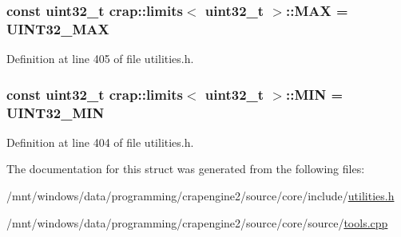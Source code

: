 \subsubsection[{M\+A\+X}]{\setlength{\rightskip}{0pt plus 5cm}const uint32\+\_\+t {\bf crap\+::limits}$<$ uint32\+\_\+t $>$\+::M\+A\+X = {\bf U\+I\+N\+T32\+\_\+\+M\+A\+X}\hspace{0.3cm}{\ttfamily [static]}}\label{structcrap_1_1limits_3_01uint32__t_01_4_aea5412ff2c53d31f208c1f716de7ce63}


Definition at line 405 of file utilities.\+h.

\hypertarget{structcrap_1_1limits_3_01uint32__t_01_4_a0e973ec2df0a7d6a93c5d78cbbdce6bf}{}
\subsubsection[{M\+I\+N}]{\setlength{\rightskip}{0pt plus 5cm}const uint32\+\_\+t {\bf crap\+::limits}$<$ uint32\+\_\+t $>$\+::M\+I\+N = {\bf U\+I\+N\+T32\+\_\+\+M\+I\+N}\hspace{0.3cm}{\ttfamily [static]}}\label{structcrap_1_1limits_3_01uint32__t_01_4_a0e973ec2df0a7d6a93c5d78cbbdce6bf}


Definition at line 404 of file utilities.\+h.



The documentation for this struct was generated from the following files\+:\begin{DoxyCompactItemize}
\item 
/mnt/windows/data/programming/crapengine2/source/core/include/\hyperlink{utilities_8h}{utilities.\+h}\item 
/mnt/windows/data/programming/crapengine2/source/core/source/\hyperlink{tools_8cpp}{tools.\+cpp}\end{DoxyCompactItemize}
